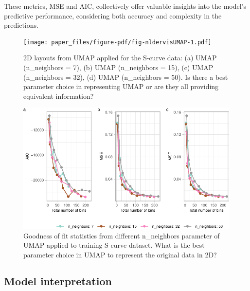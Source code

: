\documentclass[
  12pt]{article}
\begin{document}
These metrics, MSE and AIC, collectively offer valuable insights into
the model's predictive performance, considering both accuracy and
complexity in the predictions.

\begin{figure}

{\centering \texttt{[image: paper\_files/figure-pdf/fig-nldervisUMAP-1.pdf]}

}

\caption{\label{fig-nldervisUMAP}2D layouts from UMAP applied for the
S-curve data: (a) UMAP (n\_neighbors = 7), (b) UMAP (n\_neighbors = 15),
(c) UMAP (n\_neighbors = 32), (d) UMAP (n\_neighbors = 50). Is there a
best parameter choice in representing UMAP or are they all providing
equivalent information?}

\end{figure}

\begin{figure}

{\centering \includegraphics[width=1\textwidth,height=\textheight]{paper_files/figure-pdf/fig-diagnosticpltDiffParam-1.pdf}

}

\caption{\label{fig-diagnosticpltDiffParam}Goodness of fit statistics
from different n\_neighbors parameter of UMAP applied to training
S-curve dataset. What is the best parameter choice in UMAP to represent
the original data in 2D?}

\end{figure}

\hypertarget{model-interpretation}{%
\subsection{Model interpretation}\label{model-interpretation}}
\end{document}
